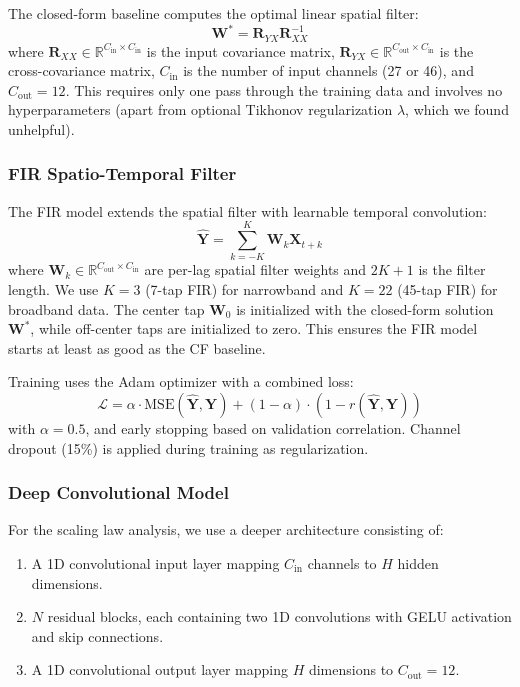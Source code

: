 \documentclass[conference]{IEEEtran}
\begin{document}
The closed-form baseline computes the optimal linear spatial filter:
\begin{equation}
    \mathbf{W}^* = \mathbf{R}_{YX} \mathbf{R}_{XX}^{-1}
\end{equation}
where $\mathbf{R}_{XX} \in \mathbb{R}^{C_{\text{in}} \times C_{\text{in}}}$ is the input covariance matrix, $\mathbf{R}_{YX} \in \mathbb{R}^{C_{\text{out}} \times C_{\text{in}}}$ is the cross-covariance matrix, $C_{\text{in}}$ is the number of input channels (27 or 46), and $C_{\text{out}} = 12$. This requires only one pass through the training data and involves no hyperparameters (apart from optional Tikhonov regularization $\lambda$, which we found unhelpful).

\subsubsection{FIR Spatio-Temporal Filter}

The FIR model extends the spatial filter with learnable temporal convolution:
\begin{equation}
    \hat{\mathbf{Y}} = \sum_{k=-K}^{K} \mathbf{W}_k \mathbf{X}_{t+k}
\end{equation}
where $\mathbf{W}_k \in \mathbb{R}^{C_{\text{out}} \times C_{\text{in}}}$ are per-lag spatial filter weights and $2K+1$ is the filter length. We use $K=3$ (7-tap FIR) for narrowband and $K=22$ (45-tap FIR) for broadband data. The center tap $\mathbf{W}_0$ is initialized with the closed-form solution $\mathbf{W}^*$, while off-center taps are initialized to zero. This ensures the FIR model starts at least as good as the CF baseline.

Training uses the Adam optimizer with a combined loss:
\begin{equation}
    \mathcal{L} = \alpha \cdot \text{MSE}(\hat{\mathbf{Y}}, \mathbf{Y}) + (1 - \alpha) \cdot (1 - r(\hat{\mathbf{Y}}, \mathbf{Y}))
\end{equation}
with $\alpha = 0.5$, and early stopping based on validation correlation. Channel dropout (15\%) is applied during training as regularization.

\subsubsection{Deep Convolutional Model}

For the scaling law analysis, we use a deeper architecture consisting of:
\begin{enumerate}
    \item A 1D convolutional input layer mapping $C_{\text{in}}$ channels to $H$ hidden dimensions.
    \item $N$ residual blocks, each containing two 1D convolutions with GELU activation and skip connections.
    \item A 1D convolutional output layer mapping $H$ dimensions to $C_{\text{out}} = 12$.
\end{enumerate}
\end{document}
